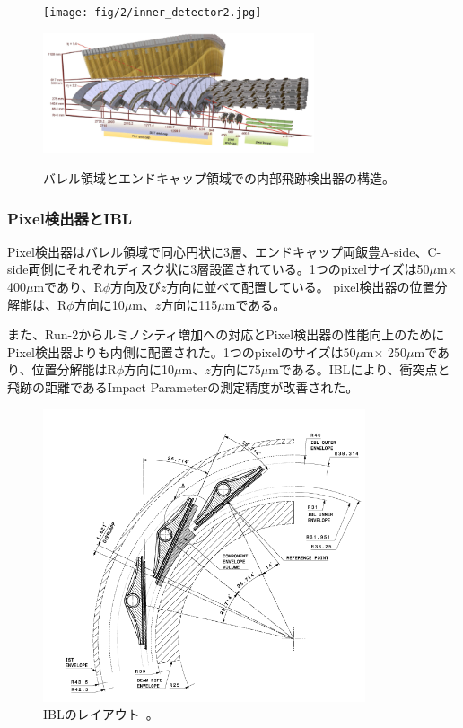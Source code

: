 \begin{figure}[h]
  \begin{minipage}[b]{0.5\linewidth}
      \centering
      \texttt{[image: fig/2/inner\_detector2.jpg]}
      \label{fig:2-8-1}
  \end{minipage}
    \begin{minipage}[b]{0.5\linewidth}
      \centering
      \includegraphics[clip, width=8cm]{fig/2/inner_detector3.png}
      \label{fig:2-8-2}
  \end{minipage}
  \caption{バレル領域とエンドキャップ領域での内部飛跡検出器の構造\cite{Aad:1129811}。}
\end{figure}

\subsubsection{Pixel検出器とIBL}
Pixel検出器はバレル領域で同心円状に3層、エンドキャップ両飯豊A-side、C-side両側にそれぞれディスク状に3層設置されている。1つのpixelサイズは50$\mu$m$\times$ 400$\mu$mであり、R$\phi$方向及び$z$方向に並べて配置している。
pixel検出器の位置分解能は、R$\phi$方向に10$\mu$m、$z$方向に115$\mu$mである。

また、Run-2からルミノシティ増加への対応とPixel検出器の性能向上のためにPixel検出器よりも内側に配置された。1つのpixelのサイズは50$\mu$m$\times$ 250$\mu$mであり、位置分解能はR$\phi$方向に10$\mu$m、$z$方向に75$\mu$mである。IBLにより、衝突点と飛跡の距離であるImpact Parameterの測定精度が改善された。

\begin{figure}[h]
  \centering
  \includegraphics[clip, width=9.5cm]{fig/2/IBL_layout.png}
  \caption{IBLのレイアウト~\cite{article:ATLASBlayerTDR}。}
  \label{fig:2-9}
\end{figure}

